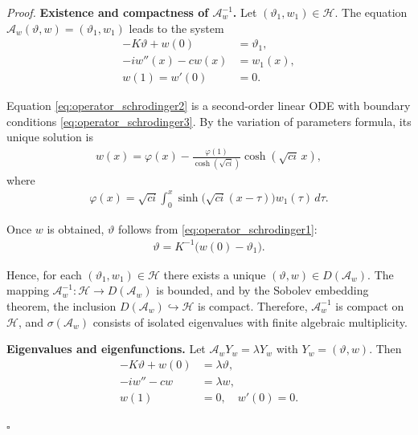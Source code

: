 \documentclass[letterpaper, 10 pt, conference]{ieeeconf}  %
\newenvironment{pf}
{\noindent\textit{Proof.}\hspace{1.2mm}}
{\hspace{\fill}$\square$}
\begin{document}
\begin{pf}
\noindent\textbf{Existence and compactness of $\mathcal{A}_{w}^{-1}$.}  
Let $(\vartheta_{1},w_{1})\in\mathcal{H}$. The equation $\mathcal{A}_{w}(\vartheta,w)=(\vartheta_{1},w_{1})$ leads to the system
\begin{align}
    -K\vartheta+w(0) &= \vartheta_{1}, \label{eq:operator_schrodinger1}\\
    -iw''(x)-cw(x) &= w_{1}(x), \label{eq:operator_schrodinger2}\\
    w(1)=w'(0)&=0. \label{eq:operator_schrodinger3}
\end{align}

Equation \eqref{eq:operator_schrodinger2} is a second-order linear ODE with boundary conditions \eqref{eq:operator_schrodinger3}. By the variation of parameters formula, its unique solution is
\begin{align}
w(x) = \varphi(x) - \frac{\varphi(1)}{\cosh(\sqrt{c i})}\cosh(\sqrt{c i}\,x),
    \label{eq:inverse_operator_schrodinger1}
\end{align}
\noindent where 
\begin{align*}
    \varphi(x) = \sqrt{c i}\!\int_{0}^{x}\sinh\!\big(\sqrt{c i}(x-\tau)\big) w_{1}(\tau)\, d\tau.
\end{align*}

Once $w$ is obtained, $\vartheta$ follows from \eqref{eq:operator_schrodinger1}:
\begin{align}
    \vartheta = K^{-1}\big(w(0)-\vartheta_{1}\big). 
    \label{eq:inverse_operator_schrodinger2}
\end{align}

Hence, for each $(\vartheta_{1},w_{1})\in\mathcal{H}$ there exists a unique $(\vartheta,w)\in D(\mathcal{A}_{w})$.  
The mapping $\mathcal{A}_{w}^{-1}\!:\mathcal{H}\to D(\mathcal{A}_{w})$ is bounded, and by the Sobolev embedding theorem, the inclusion $D(\mathcal{A}_{w})\hookrightarrow\mathcal{H}$ is compact.  
Therefore, $\mathcal{A}_{w}^{-1}$ is compact on $\mathcal{H}$, and $\sigma(\mathcal{A}_{w})$ consists of isolated eigenvalues with finite algebraic multiplicity. 

\medskip

\noindent\textbf{Eigenvalues and eigenfunctions.}  
Let $\mathcal{A}_{w}Y_{w}=\lambda Y_{w}$ with $Y_{w}=(\vartheta,w)$. Then
\begin{align}
    -K\vartheta+w(0) &= \lambda \vartheta, \label{eq:eigen1}\\
    -iw''-cw &= \lambda w, \label{eq:eigen2}\\
    w(1)&=0,\quad w'(0)=0. \label{eq:eigen3}
\end{align}


\end{pf}
\end{document}
